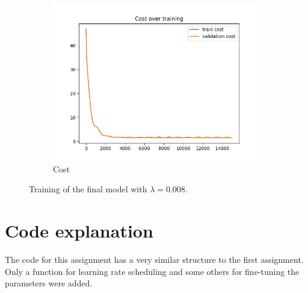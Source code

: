 \documentclass[a4paper]{article}
\begin{document}
\begin{figure}[h]
\begin{subfigure}{0.3\textwidth}
		\includegraphics[width=\linewidth]{images/final_cost.png}
		\caption{Cost}
	\end{subfigure}
	\caption{Training of the final model with $\lambda=0.008$.}
	\label{fig:final}
\end{figure}


\section{Code explanation}
The code for this assignment has a very similar structure to the first assignment. Only a function for learning rate scheduling and some others for fine-tuning the parameters were added.






%
%
\end{document}
